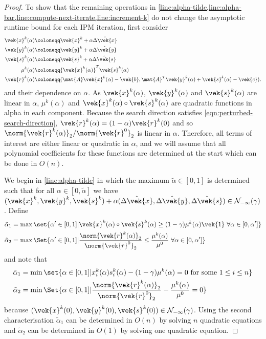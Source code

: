 \begin{proof}
  To show that the remaining operations in \cref{line:alpha-tilde,line:alpha-bar,line:compute-next-iterate,line:increment-k} do not change the asymptotic runtime bound for each IPM iteration, first consider
  \begin{align*}
    \vek{x}^k(\alpha) &\coloneqq \vek{x}^k + \alpha \hat{\Delta\vek{x}} \\
    \vek{y}^k(\alpha) &\coloneqq \vek{y}^k + \alpha \hat{\Delta\vek{y}} \\
    \vek{s}^k(\alpha) &\coloneqq \vek{s}^k + \alpha \hat{\Delta\vek{s}} \\
    \mu^k(\alpha) &\coloneqq {\vek{x}^k(\alpha)}^T \vek{s}^k(\alpha) \\
    \vek{r}^k(\alpha) &\coloneqq (\mat{A}\vek{x}^k(\alpha) - \vek{b}, \mat{A}^T \vek{y}^k(\alpha) + \vek{s}^k(\alpha) - \vek{c}).
  \end{align*}
  and their dependence on \(\alpha\).
  As \(\vek{x}^k(\alpha)\), \(\vek{y}^k(\alpha)\) and \(\vek{s}^k(\alpha)\) are linear in \(\alpha\), \(\mu^k(\alpha)\) and \(\vek{x}^k(\alpha) \circ \vek{s}^k(\alpha)\) are quadratic functions in alpha in each component.
  Because the search direction satisfies \cref{eqn:perturbed-search-direction}, \(\vek{r}^k(\alpha) = (1 - \alpha)\vek{r}^k(0)\) and so \(\norm{\vek{r}^k(\alpha)}_2 / \norm{\vek{r}^0}_2\) is linear in \(\alpha\).
  Therefore, all terms of interest are either linear or quadratic in \(\alpha\), and we will assume that all polynomial coefficients for these functions are determined at the start which can be done in \(O(n)\).

  We begin in \cref{line:alpha-tilde} in which the maximum \(\tilde{\alpha} \in [0, 1]\) is determined such that for all \(\alpha \in [0, \tilde{\alpha}]\) we have \((\vek{x}^k, \vek{y}^k, \vek{s}^k) + \alpha (\hat{\Delta\vek{x}}, \hat{\Delta\vek{y}}, \hat{\Delta\vek{s}}) \in \mathcal{N}_{-\infty}(\gamma)\).
  Define
  \begin{align*}
    \tilde{\alpha}_1 &= \max \set{\alpha' \in [0, 1] | \vek{x}^k(\alpha) \circ \vek{s}^k(\alpha) \geq (1 - \gamma)\mu^k(\alpha) \vek{1} \ \forall \alpha \in [0, \alpha']} \\
    \tilde{\alpha}_2 &= \max \Set{\alpha' \in [0, 1] | \frac{\norm{\vek{r}^k(\alpha)}_2}{\norm{\vek{r}^0}_2} \leq \frac{\mu^k(\alpha)}{\mu^0} \ \forall \alpha \in [0, \alpha']}
  \end{align*}
  and note that
  \begin{align*}
    \tilde{\alpha}_1 &= \min \set{ \alpha \in [0, 1] | x_i^k(\alpha) s_i^k(\alpha) - (1 - \gamma)\mu^k(\alpha) = 0 \text{ for some } 1 \leq i \leq n } \\
    \tilde{\alpha}_2 &= \min \Set{ \alpha \in [0, 1] | \frac{\norm{\vek{r}^k(\alpha)}_2}{\norm{\vek{r}^0}_2} - \frac{\mu^k(\alpha)}{\mu^0} = 0 }
  \end{align*}
  because \((\vek{x}^k(0), \vek{y}^k(0), \vek{s}^k(0)) \in \mathcal{N}_{-\infty}(\gamma)\).
  Using the second characterisation \(\tilde{\alpha}_1\) can be determined in \(O(n)\) by solving \(n\) quadratic equations and \(\tilde{\alpha}_2\) can be determined in \(O(1)\) by solving one quadratic equation.


\end{proof}
